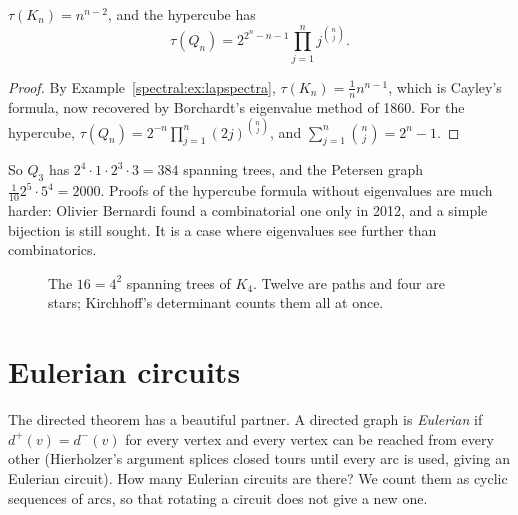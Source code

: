 \begin{corollary}\label{spectral:cor:treecounts}
$\tau(K_n)=n^{n-2}$, and the hypercube has
\[
\tau(Q_n)=2^{2^n-n-1}\prod_{j=1}^nj^{\binom nj}.
\]
\end{corollary}
\begin{proof}
By Example~\ref{spectral:ex:lapspectra}, $\tau(K_n)=\frac1nn^{n-1}$, which is Cayley's formula, now recovered by Borchardt's eigenvalue method of 1860. For the hypercube,
$\tau(Q_n)=2^{-n}\prod_{j=1}^n(2j)^{\binom nj}$, and $\sum_{j=1}^n\binom nj=2^n-1$.
\end{proof}

So $Q_3$ has $2^4\cdot1\cdot2^3\cdot3=384$ spanning trees, and the Petersen graph $\frac1{10}2^5\cdot5^4=2000$. Proofs of the hypercube formula without eigenvalues are much harder: Olivier Bernardi found a combinatorial one only in 2012, and a simple bijection is still sought.
It is a case where eigenvalues see further than combinatorics.

\begin{figure}[ht]
\centering
{}
\caption{The $16=4^2$ spanning trees of $K_4$. Twelve are paths and four are stars; Kirchhoff's determinant counts them all at once.}
\label{spectral:fig:k4trees}
\end{figure}

\section{Eulerian circuits}

The directed theorem has a beautiful partner. A directed graph is \emph{Eulerian} if $d^+(v)=d^-(v)$ for every vertex and every vertex can be reached from every
other (Hierholzer's argument splices closed tours until every arc is used, giving an Eulerian circuit). How many Eulerian circuits are there? We count them as
cyclic sequences of arcs, so that rotating a circuit does not give a new one.

